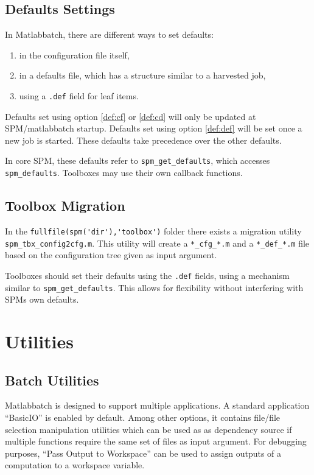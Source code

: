 \subsection{Defaults Settings}

In Matlabbatch, there are different ways to set defaults:
\begin{enumerate}
\item \label{def:cf}in the configuration file itself,
\item \label{def:cd}in a defaults file, which has a structure similar to a harvested
  job,
\item \label{def:def}using a \verb|.def| field for leaf items.
\end{enumerate}
Defaults set using option \ref{def:cf} or \ref{def:cd} will only be
updated at SPM/matlabbatch startup. Defaults set using option
\ref{def:def} will be set once a new job is started. These defaults take
precedence over the other defaults.

In core SPM, these defaults refer to \verb|spm_get_defaults|, which accesses
\verb|spm_defaults|. Toolboxes may use their own callback functions.

\subsection{Toolbox Migration}

In the \verb|fullfile(spm('dir'),'toolbox')| folder there exists a migration
utility \verb|spm_tbx_config2cfg.m|. This utility will create a
\verb|*_cfg_*.m| and a \verb|*_def_*.m| file based on the configuration tree
given as input argument.

Toolboxes should set their defaults using the \verb|.def| fields,
using a mechanism similar to \verb|spm_get_defaults|. This allows for
flexibility without interfering with SPMs own defaults.

\section{Utilities}

\subsection{Batch Utilities}

Matlabbatch is designed to support multiple applications. A standard
application ``BasicIO'' is enabled by default. Among other options, it
contains file/file selection manipulation utilities which can be used as as
dependency source if multiple functions require the same set of files as input
argument. For debugging purposes, ``Pass Output to Workspace'' can be used to
assign outputs of a computation to a workspace variable.

